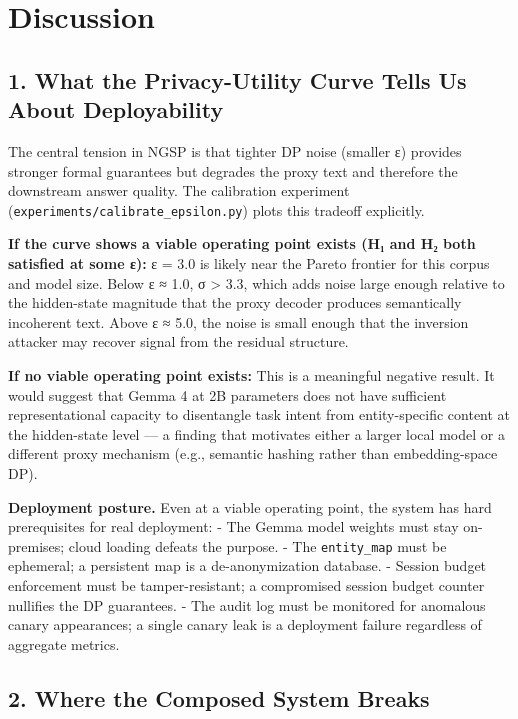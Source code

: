 \section{Discussion}\label{discussion}

\subsection{1. What the Privacy-Utility Curve Tells Us About
Deployability}\label{what-the-privacy-utility-curve-tells-us-about-deployability}

The central tension in NGSP is that tighter DP noise (smaller ε)
provides stronger formal guarantees but degrades the proxy text and
therefore the downstream answer quality. The calibration experiment
(\texttt{experiments/calibrate\_epsilon.py}) plots this tradeoff
explicitly.

\textbf{If the curve shows a viable operating point exists (H₁ and H₂
both satisfied at some ε):} ε = 3.0 is likely near the Pareto frontier
for this corpus and model size. Below ε ≈ 1.0, σ \textgreater{} 3.3,
which adds noise large enough relative to the hidden-state magnitude
that the proxy decoder produces semantically incoherent text. Above ε ≈
5.0, the noise is small enough that the inversion attacker may recover
signal from the residual structure.

\textbf{If no viable operating point exists:} This is a meaningful
negative result. It would suggest that Gemma 4 at 2B parameters does not
have sufficient representational capacity to disentangle task intent
from entity-specific content at the hidden-state level --- a finding
that motivates either a larger local model or a different proxy
mechanism (e.g., semantic hashing rather than embedding-space DP).

\textbf{Deployment posture.} Even at a viable operating point, the
system has hard prerequisites for real deployment: - The Gemma model
weights must stay on-premises; cloud loading defeats the purpose. - The
\texttt{entity\_map} must be ephemeral; a persistent map is a
de-anonymization database. - Session budget enforcement must be
tamper-resistant; a compromised session budget counter nullifies the DP
guarantees. - The audit log must be monitored for anomalous canary
appearances; a single canary leak is a deployment failure regardless of
aggregate metrics.

\subsection{2. Where the Composed System
Breaks}\label{where-the-composed-system-breaks}

